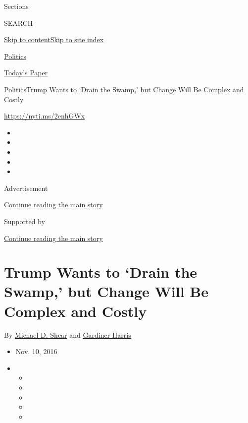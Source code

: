 Sections

SEARCH

\protect\hyperlink{site-content}{Skip to
content}\protect\hyperlink{site-index}{Skip to site index}

\href{https://www.nytimes.com/section/politics}{Politics}

\href{https://myaccount.nytimes.com/auth/login?response_type=cookie\&client_id=vi}{}

\href{https://www.nytimes.com/section/todayspaper}{Today's Paper}

\href{/section/politics}{Politics}\textbar{}Trump Wants to `Drain the
Swamp,' but Change Will Be Complex and Costly

\url{https://nyti.ms/2enhGWx}

\begin{itemize}
\item
\item
\item
\item
\item
\end{itemize}

Advertisement

\protect\hyperlink{after-top}{Continue reading the main story}

Supported by

\protect\hyperlink{after-sponsor}{Continue reading the main story}

\hypertarget{trump-wants-to-drain-the-swamp-but-change-will-be-complex-and-costly}{%
\section{Trump Wants to `Drain the Swamp,' but Change Will Be Complex
and
Costly}\label{trump-wants-to-drain-the-swamp-but-change-will-be-complex-and-costly}}

By \href{https://www.nytimes.com/by/michael-d-shear}{Michael D. Shear}
and \href{https://www.nytimes.com/by/gardiner-harris}{Gardiner Harris}

\begin{itemize}
\item
  Nov. 10, 2016
\item
  \begin{itemize}
  \item
  \item
  \item
  \item
  \item
  \end{itemize}
\end{itemize}

